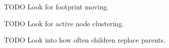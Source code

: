 \documentclass[journal]{IEEEtran}
\begin{document}
TODO Look for footprint moving.

TODO Look for active node clustering.

TODO Look into how often children replace parents.


%
%



%
%
\end{document}
